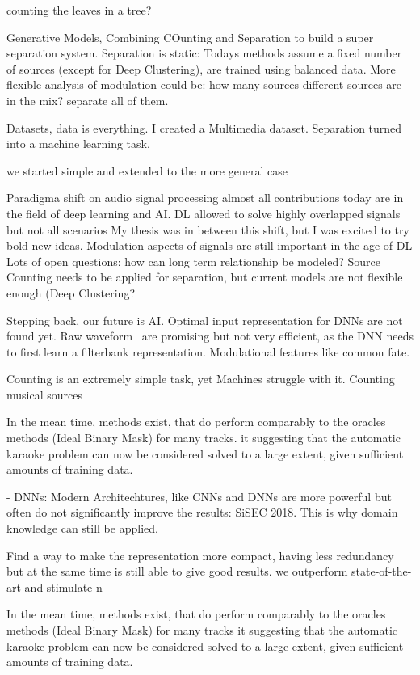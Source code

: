 counting the leaves in a tree?

Generative Models, 
Combining COunting and Separation to build a super separation system.
Separation is static: Todays methods assume a fixed number of sources (except for Deep Clustering), are trained using balanced data. More flexible analysis of modulation could be: how many sources different sources are in the mix? separate all of them.

Datasets, data is everything. I created a Multimedia dataset. 
Separation turned into a machine learning task.

we started simple and extended to the more general case

Paradigma shift on audio signal processing almost all contributions today are in the field of deep learning and AI.
DL allowed to solve highly overlapped signals but not all scenarios
My thesis was in between this shift, but I was excited to try bold new ideas. 
Modulation aspects of signals are still important in the age of DL
Lots of open questions: how can long term relationship be modeled?
Source Counting needs to be applied for separation, but current models are not flexible enough (Deep Clustering?

Stepping back, our future is AI.
Optimal input representation for DNNs are not found yet. Raw waveform~\cite{Dieleman14, wavenet} are promising but not very efficient, as the DNN needs to first learn a filterbank representation. Modulational features like common fate.

Counting is an extremely simple task, yet Machines struggle with it. 
Counting musical sources

  In the mean time\cite{stoeter18},  methods exist, that do perform comparably to the oracles methods (Ideal Binary Mask) for many tracks.
 it suggesting that the automatic karaoke problem can now be considered
solved to a large extent, given sufficient amounts of training data.


- DNNs: Modern Architechtures, like CNNs and DNNs are more powerful but often do not significantly improve the results: SiSEC 2018. This is why domain knowledge can still be applied.

Find a way to make the representation more compact, having less redundancy but at the same time is still able to give good results.
we outperform state-of-the-art and stimulate n



In the mean time\cite{stoeter18}, methods exist, that do perform comparably to the oracles methods (Ideal Binary Mask) for many tracks it suggesting that the automatic karaoke problem can now be considered
solved to a large extent, given sufficient amounts of training data.